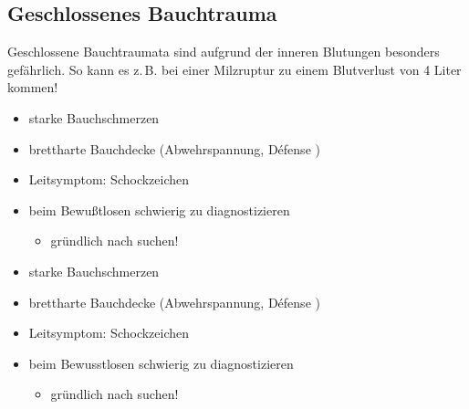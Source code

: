 \subsection{Geschlossenes Bauchtrauma}

Geschlossene Bauchtraumata sind aufgrund der inneren Blutungen besonders
gefährlich. So kann es z.\,B. bei einer Milzruptur zu einem Blutverlust von 4 Liter kommen!


{
\begin{itemize}
  \item starke  Bauchschmerzen
  \item brettharte  Bauchdecke  (Abwehrspannung, D\'efense )
  \item Leitsymptom: Schockzeichen
  \item beim Bewußtlosen schwierig zu  diagnostizieren
  \begin{itemize}
    \item gründlich nach 
    suchen!
  \end{itemize}
\end{itemize}
}{
\begin{itemize}
  \item starke  Bauchschmerzen
  \item brettharte  Bauchdecke  (Abwehrspannung, D\'efense )
  \item Leitsymptom: Schockzeichen
  \item beim Bewusstlosen schwierig zu  diagnostizieren
  \begin{itemize}
    \item gründlich nach 
    suchen!
  \end{itemize}
\end{itemize}
}{}{}{}


